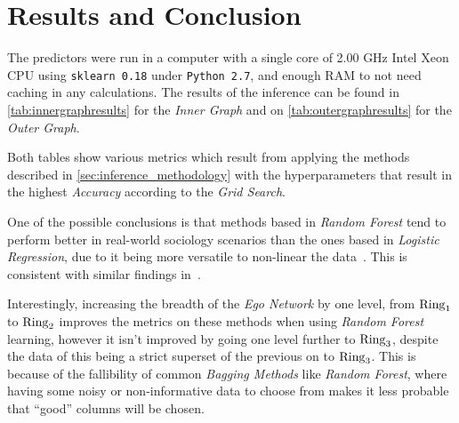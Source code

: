 \section{Results and Conclusion}
\label{sec:results}


The predictors were run in a computer with a single core of 2.00 GHz Intel Xeon CPU using \texttt{sklearn 0.18} under \texttt{Python 2.7}, and enough RAM to not need caching in any calculations. The results of the inference can be found in \cref{tab:innergraphresults} for the \emph{Inner Graph} and on \cref{tab:outergraphresults} for the \emph{Outer Graph}.


Both tables show various metrics which result from applying the methods described in \cref{sec:inference_methodology} with the hyperparameters that result in the highest \emph{Accuracy} according to the \emph{Grid Search}.

One of the possible conclusions is that methods based in \emph{Random Forest} tend to perform better in real-world sociology scenarios than the ones based in \emph{Logistic Regression}, due to it being more versatile to non-linear the data~\cite{logisticvsdecision}. This is consistent with similar findings in~\cite{muchlinski2016}.

Interestingly, increasing the breadth of the \emph{Ego Network} by one level, from $\operatorname{Ring}_1$ to $\operatorname{Ring}_2$ improves the metrics on these methods when using \emph{Random Forest} learning, however it isn't improved by going one level further to $\operatorname{Ring}_3$, despite the data of this being a strict superset of the previous on to $\operatorname{Ring}_3$. This is because of the fallibility of common \emph{Bagging Methods} like \emph{Random Forest}, where having some noisy or non-informative data to choose from makes it less probable that ``good'' columns will be chosen.

